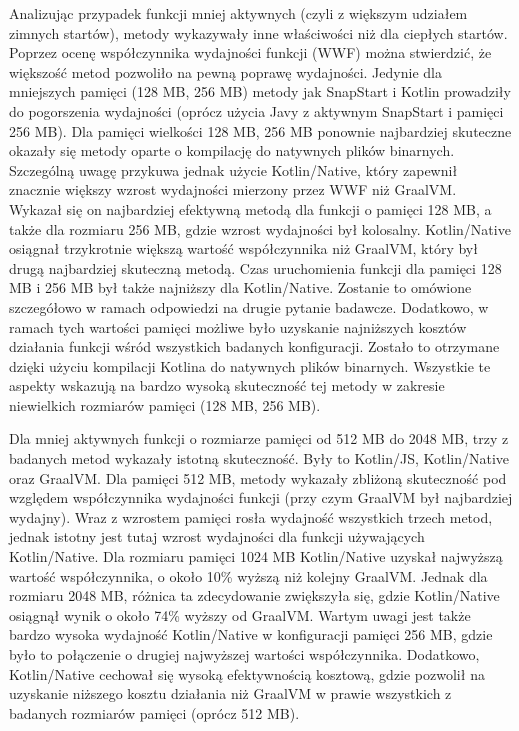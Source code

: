 Analizując przypadek funkcji mniej aktywnych (czyli z większym udziałem zimnych startów), metody wykazywały inne właściwości niż dla ciepłych startów.
Poprzez ocenę współczynnika wydajności funkcji (WWF) można stwierdzić, że większość metod pozwoliło na pewną poprawę wydajności.
Jedynie dla mniejszych pamięci (128 MB, 256 MB) metody jak SnapStart i Kotlin prowadziły do pogorszenia wydajności (oprócz użycia Javy z aktywnym SnapStart i pamięci 256 MB).
Dla pamięci wielkości 128 MB, 256 MB ponownie najbardziej skuteczne okazały się metody oparte o kompilację do natywnych plików binarnych.
Szczególną uwagę przykuwa jednak użycie Kotlin/Native, który zapewnił znacznie większy wzrost wydajności mierzony przez WWF niż GraalVM.
Wykazał się on najbardziej efektywną metodą dla funkcji o pamięci 128 MB, a także dla rozmiaru 256 MB, gdzie wzrost wydajności był kolosalny.
Kotlin/Native osiągnał trzykrotnie większą wartość współczynnika niż GraalVM, który był drugą najbardziej skuteczną metodą.
Czas uruchomienia funkcji dla pamięci 128 MB i 256 MB był także najniższy dla Kotlin/Native.
Zostanie to omówione szczegółowo w ramach odpowiedzi na drugie pytanie badawcze.
Dodatkowo, w ramach tych wartości pamięci możliwe było uzyskanie najniższych kosztów działania funkcji wśród wszystkich badanych konfiguracji.
Zostało to otrzymane dzięki użyciu kompilacji Kotlina do natywnych plików binarnych.
Wszystkie te aspekty wskazują na bardzo wysoką skuteczność tej metody w zakresie niewielkich rozmiarów pamięci (128 MB, 256 MB).

Dla mniej aktywnych funkcji o rozmiarze pamięci od 512 MB do 2048 MB, trzy z badanych metod wykazały istotną skuteczność.
Były to Kotlin/JS, Kotlin/Native oraz GraalVM.
Dla pamięci 512 MB, metody wykazały zbliżoną skuteczność pod względem współczynnika wydajności funkcji (przy czym GraalVM był najbardziej wydajny).
Wraz z wzrostem pamięci rosła wydajność wszystkich trzech metod, jednak istotny jest tutaj wzrost wydajności dla funkcji używających Kotlin/Native.
Dla rozmiaru pamięci 1024 MB Kotlin/Native uzyskał najwyższą wartość współczynnika, o około 10\% wyższą niż kolejny GraalVM.
Jednak dla rozmiaru 2048 MB, różnica ta zdecydowanie zwiększyła się, gdzie Kotlin/Native osiągnął wynik o około 74\% wyższy od GraalVM.
Wartym uwagi jest także bardzo wysoka wydajność Kotlin/Native w konfiguracji pamięci 256 MB, gdzie było to połączenie o drugiej najwyższej wartości współczynnika.
Dodatkowo, Kotlin/Native cechował się wysoką efektywnością kosztową, gdzie pozwolił na uzyskanie niższego kosztu działania niż GraalVM w prawie wszystkich z badanych rozmiarów pamięci (oprócz 512 MB).

